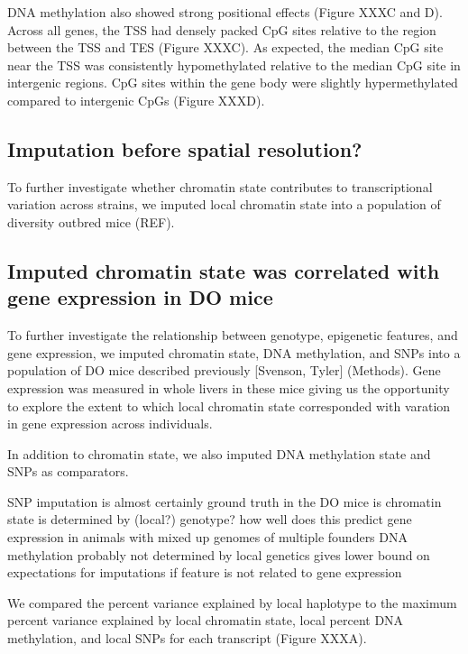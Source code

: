 \documentclass[10pt,letterpaper]{article}
\begin{document}
DNA methylation also showed strong positional effects (Figure XXXC and
D). Across all genes, the TSS had densely packed CpG sites relative to
the region between the TSS and TES (Figure XXXC). As expected, the
median CpG site near the TSS was consistently hypomethylated relative to
the median CpG site in intergenic regions. CpG sites within the gene
body were slightly hypermethylated compared to intergenic CpGs (Figure
XXXD).

\hypertarget{imputation-before-spatial-resolution}{%
\subsection{Imputation before spatial
resolution?}\label{imputation-before-spatial-resolution}}

To further investigate whether chromatin state contributes to
transcriptional variation across strains, we imputed local chromatin
state into a population of diversity outbred mice (REF).

\hypertarget{imputed-chromatin-state-was-correlated-with-gene-expression-in-do-mice}{%
\subsection{Imputed chromatin state was correlated with gene expression
in DO
mice}\label{imputed-chromatin-state-was-correlated-with-gene-expression-in-do-mice}}

To further investigate the relationship between genotype, epigenetic
features, and gene expression, we imputed chromatin state, DNA
methylation, and SNPs into a population of DO mice described previously
{[}Svenson, Tyler{]} (Methods). Gene expression was measured in whole
livers in these mice giving us the opportunity to explore the extent to
which local chromatin state corresponded with varation in gene
expression across individuals.

In addition to chromatin state, we also imputed DNA methylation state
and SNPs as comparators.

SNP imputation is almost certainly ground truth in the DO mice is
chromatin state is determined by (local?) genotype? how well does this
predict gene expression in animals with mixed up genomes of multiple
founders DNA methylation probably not determined by local genetics gives
lower bound on expectations for imputations if feature is not related to
gene expression

We compared the percent variance explained by local haplotype to the
maximum percent variance explained by local chromatin state, local
percent DNA methylation, and local SNPs for each transcript (Figure
XXXA).
\end{document}
